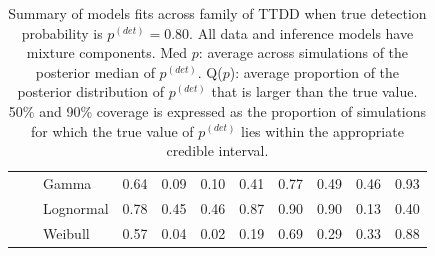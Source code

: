 \documentclass[useAMS,usenatbib,referee,12pt]{article}
\newcommand{\pdet}{p^{(det)}}
\begin{document}
\begin{table}[ht]
\begin{tabular}{l|l|l|cccc|cccc}
\cline{2-11}
& \parbox[t]{2mm}{} & Gamma & 0.64 & 0.09 & 0.10 & 0.41 & 0.77 & 0.49 & 0.46 & 0.93 \\ 
   &  & Lognormal & 0.78 & 0.45 & 0.46 & 0.87 & 0.90 & 0.90 & 0.13 & 0.40 \\ 
   &  & Weibull & 0.57 & 0.04 & 0.02 & 0.19 & 0.69 & 0.29 & 0.33 & 0.88 \\ 
   \hline
\end{tabular}
\caption{Summary of models fits across family of TTDD when true detection probability is $\pdet = 0.80$.
All data and inference models have mixture components.
Med $p$: average across simulations of the posterior median of $\pdet$.  
Q($p$): average proportion of the posterior distribution of $\pdet$ that is larger than the true value.  
50\% and 90\% coverage is expressed as the proportion of simulations for which the true value of $\pdet$ lies within the appropriate credible interval.}
\label{tbl:sim2}

\vspace{0.5cm}


\end{table}
\end{document}
